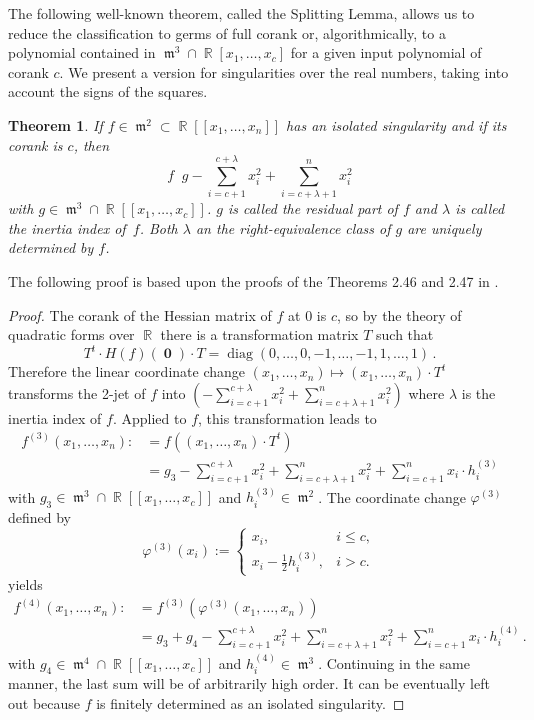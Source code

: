 \documentclass[noend]{amsproc}
\newtheorem{theorem}{Theorem}
\theoremstyle{definition}
\DeclareMathOperator{\requiv}{\overset{r}{\sim}}
\DeclareMathOperator{\m}{\mathfrak{m}}
\DeclareMathOperator{\diag}{diag}
\DeclareMathOperator{\R}{\mathbb{R}}
\DeclareMathOperator{\boldzero}{\mathbf{0}}
\begin{document}
The following well-known theorem, called the Splitting Lemma, allows us to
reduce the classification to germs of full corank or, algorithmically, to
a polynomial contained in $\m^3 \cap \R[x_1,\ldots,x_c]$ for a given input
polynomial of corank $c$. We present a version for singularities over the real
numbers, taking into account the signs of the squares.

\begin{theorem}\label{SplittingLemma}
If $f \in \m^2 \subset \R[[x_1,\ldots,x_n]]$ has an isolated singularity and if
its corank is $c$, then
\[
f \requiv g -\sum_{i=c+1}^{c+\lambda} x_i^2 +\sum_{i=c+\lambda+1}^n x_i^2
\]
with $g \in \m^3 \cap \R[[x_1,\ldots,x_c]]$. $g$ is called the residual part of
$f$ and $\lambda$ is called the inertia index of~$f$. Both $\lambda$ an the
right-equivalence class of $g$ are uniquely determined by $f$.
\end{theorem}

The following proof is based upon the proofs of the Theorems 2.46 and 2.47 in
\citet{GLS2007}.

\begin{proof}
The corank of the Hessian matrix of $f$ at $0$ is $c$, so by the theory of
quadratic forms over $\R$ there is a transformation matrix $T$ such that
\[
T^t \cdot H(f)(\boldzero) \cdot T = \diag(0,\ldots,0,-1,\ldots,-1,1,\ldots,1)
\,.
\]
Therefore the linear coordinate change
$(x_1,\ldots,x_n) \mapsto (x_1,\ldots,x_n) \cdot T^t$ transforms the 2-jet of
$f$ into
$\left(-\sum_{i=c+1}^{c+\lambda} x_i^2 +\sum_{i=c+\lambda+1}^n x_i^2\right)$
where $\lambda$ is the inertia index of $f$.
Applied to $f$, this transformation leads to
\begin{align*}
f^{(3)} (x_1,\ldots,x_n)
  :\!&= f((x_1,\ldots,x_n) \cdot T^t) \\
  &= g_3
  -\sum_{i=c+1}^{c+\lambda} x_i^2 +\sum_{i=c+\lambda+1}^n x_i^2
  +\sum_{i=c+1}^n x_i\cdot h_i^{(3)}
\end{align*}
with $g_3 \in \m^3 \cap \R[[x_1,\ldots,x_c]]$ and $h_i^{(3)} \in \m^2$. The
coordinate change $\varphi^{(3)}$ defined by
\[
\varphi^{(3)}(x_i) :=
\begin{cases}
x_i, &i \leq c, \\
x_i-\frac{1}{2}h_i^{(3)}, &i > c.
\end{cases}
\]
yields
\begin{align*}
f^{(4)} (x_1,\ldots,x_n)
  :\!&= f^{(3)}(\varphi^{(3)}(x_1,\ldots,x_n)) \\
  &= g_3 +g_4
  -\sum_{i=c+1}^{c+\lambda} x_i^2 +\sum_{i=c+\lambda+1}^n x_i^2
  +\sum_{i=c+1}^n x_i\cdot h_i^{(4)} \,.
\end{align*}
with $g_4 \in \m^4 \cap \R[[x_1,\ldots,x_c]]$ and $h_i^{(4)} \in \m^3$.
Continuing in the same manner, the last sum will be of arbitrarily high order.
It can be eventually left out because $f$ is finitely determined as an isolated
singularity.
\end{proof}
\end{document}
